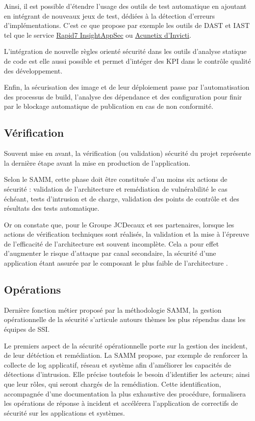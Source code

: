 Ainsi, il est possible d'étendre l'usage des outils de test automatique en ajoutant en intégrant de nouveaux jeux de test, dédiées à la 
détection d'erreurs d'implémentations.
C'est ce que propose par exemple les outils de \ac{DAST}  et \ac{IAST} tel que le service 
\href{https://www.rapid7.com/products/insightappsec/}{Rapid7 InsightAppSec} ou \href{https://www.acunetix.com/}{Acunetix d'Invicti}.

L'intégration de nouvelle règles orienté sécurité dans les outils d'analyse statique de code est elle aussi possible et permet d'intéger
des \ac{KPI} dans le contrôle qualité des développement.

Enfin, la sécurisation des image et de leur déploiement passe par l'automatisation des processus de build, l'analyse des dépendance et des
configuration pour finir par le blockage automatique de publication en cas de non conformité.

\subsection{Vérification}

Souvent mise en avant, la vérification (ou validation) sécurité du projet représente la dernière étape avant la mise en production de 
l'application. 

Selon le \ac{SAMM}, cette phase doit être constituée d'au moins six actions de sécurité : validation de l'architecture et remédiation de
vulnérabilité le cas échéant, tests d'intrusion et de charge, validation des points de contrôle et des résultats des tests automatique.

Or on constate que, pour le Groupe JCDecaux et ses partenaires, lorsque les actions de vérification techniques sont réalisés, la validation
et la mise à l'épreuve de l'efficacité de l'architecture est souvent incomplète. Cela a pour effet d'augmenter le risque d'attaque par canal
secondaire, la sécurité d'une application étant assurée par le composant le plus faible de l'architecture .

\subsection{Opérations}
Dernière fonction métier proposé par la méthodologie \ac{SAMM}, la gestion opérationnelle de la sécurité s'articule autours thèmes les plus
répendus dans les équipes de \ac{SSI}.

Le premiers aspect de la sécurité opérationnelle porte sur la gestion des incident, de leur détéction et remédiation.
La \ac{SAMM} propose, par exemple de renforcer la collecte de log applicatif, réseau et système afin d'améliorer les capacités de détections
d'intrusion. 
\newline Elle précise toutefois le besoin d'identifier les acteurs; ainsi que leur rôles, qui seront chargés de la remédiation. 
Cette identification, accompagnée d'une documentation la plus exhaustive des procédure, formalisera les opérations de réponse à incident 
et accélérera l'application de correctifs de sécurité sur les applications et systèmes.

